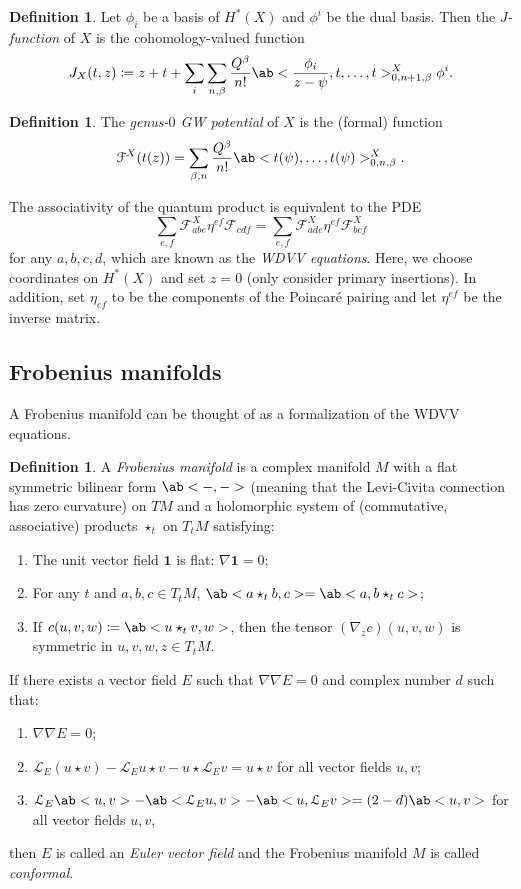 \documentclass[leqno, openany]{memoir}
\theoremstyle{definition}
\newtheorem{defn}[thm]{Definition}
\theoremstyle{remark}
\theoremstyle{plain}
\theoremstyle{definition}
\theoremstyle{remark}
\newcommand{\mc}[1]{\mathcal{#1}}
\newcommand{\mbf}[1]{\mathbf{#1}}
\begin{document}
\begin{defn}\label{defn:jfunction}
    Let $\phi_i$ be a basis of $H^*(X)$ and $\phi^i$ be the dual basis. Then the \textit{$J$-function} of $X$ is the cohomology-valued function
    \[ J_X(t,z) \coloneqq z + t + \sum_i \sum_{n,\beta} \frac{Q^{\beta}}{n!} \ab<\frac{\phi_i}{z-\psi}, t, \ldots, t>_{0,n+1,\beta}^X \phi^i. \]
\end{defn}

\begin{defn}
    The \textit{genus-$0$ GW potential} of $X$ is the (formal) function
    \[ \mc{F}^X(t(z)) = \sum_{\beta, n} \frac{Q^{\beta}}{n!} \ab<t(\psi), \ldots, t(\psi)>_{0,n,\beta}^X. \]
\end{defn}

The associativity of the quantum product is equivalent to the PDE
\[ \sum_{e,f} \mc{F}^X_{abe} \eta^{ef} \mc{F}_{cdf} = \sum_{e,f} \mc{F}^X_{ade} \eta^{ef} \mc{F}^X_{bcf} \]
for any $a,b,c,d$, which are known as the \textit{WDVV equations}. Here, we choose coordinates on $H^*(X)$ and set $z=0$ (only consider primary insertions). In addition, set $\eta_{ef}$ to be the components of the Poincar\'e pairing and let $\eta^{ef}$ be the inverse matrix.


\subsection{Frobenius manifolds}

A Frobenius manifold can be thought of as a formalization of the WDVV equations.

\begin{defn}
    A \textit{Frobenius manifold} is a complex manifold $M$ with a flat symmetric bilinear form $\ab<-,->$ (meaning that the Levi-Civita connection has zero curvature) on $TM$ and a holomorphic system of (commutative, associative) products $\star_t$ on $T_t M$ satisfying:
    \begin{enumerate}
        \item The unit vector field $\mbf{1}$ is flat: $\nabla \mbf{1} = 0$;
        \item For any $t$ and $a,b,c \in T_t M$, $\ab<a \star_t b, c> = \ab<a, b \star_t c>$;
        \item If $c(u,v,w) \coloneqq \ab<u \star_t v, w>$, then the tensor $(\nabla_z c)(u,v,w)$ is symmetric in $u,v,w,z \in T_t M$.
    \end{enumerate}
    If there exists a vector field $E$ such that $\nabla \nabla E = 0$ and complex number $d$ such that:
    \begin{enumerate}
        \item $\nabla \nabla E = 0$;
        \item $\mc{L}_E(u \star v) - \mc{L}_E u \star v - u \star \mc{L}_E v = u \star v$ for all vector fields $u,v$;
        \item $\mc{L}_E \ab<u,v> - \ab<\mc{L}_E u,v> - \ab<u,\mc{L}_E v> = (2-d) \ab<u,v>$ for all vector fields $u,v$,
    \end{enumerate}
    then $E$ is called an \textit{Euler vector field} and the Frobenius manifold $M$ is called \textit{conformal}.
\end{defn}
\end{document}
